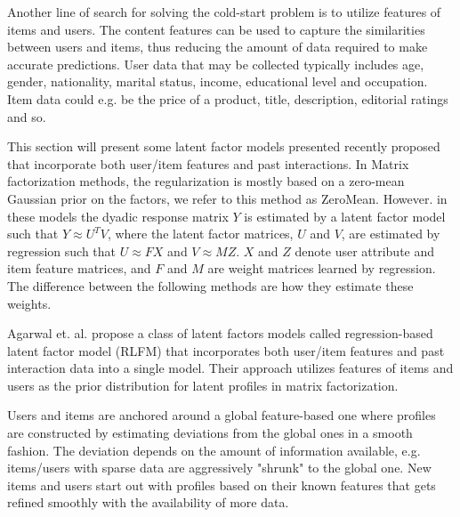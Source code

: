 
Another line of search for solving the cold-start problem is to utilize features of items and users. The content features can be used to capture the similarities between users and items, thus reducing the amount of data required to make accurate predictions. User data that may be collected typically includes age, gender, nationality, marital status, income, educational level and occupation. Item data could e.g. be the price of a product, title, description, editorial ratings and so.


This section will present some latent factor models presented recently proposed that incorporate both user/item features and past interactions. In Matrix factorization methods, the regularization is mostly based on a
zero-mean Gaussian prior on the factors, we refer to this method as ZeroMean. However. in these models the dyadic response matrix $Y$ is estimated by a latent factor model such that $Y \approx U^{T}V$, where the latent factor matrices, $U$ and $V$, are estimated by regression such that $U \approx FX$ and $V \approx MZ$. $X$ and $Z$ denote user attribute and item feature matrices, and $F$ and $M$ are weight matrices learned by regression. The difference between the following methods are how they estimate these weights.


Agarwal et. al. \cite{Agarwal2009} propose a class of latent factors models
called regression-based latent factor model (RLFM) that incorporates both user/item features and past interaction data
into a single model. Their approach utilizes features of items and users as the
prior distribution for latent profiles in matrix factorization.

Users and items are anchored around a global feature-based one where profiles are constructed by estimating deviations from the global ones in a smooth fashion. The deviation depends on the amount of information available, e.g. items/users with sparse data are aggressively "shrunk" to the global one. New items and users start out with profiles based on their known features that gets refined smoothly with the availability of more data. 

